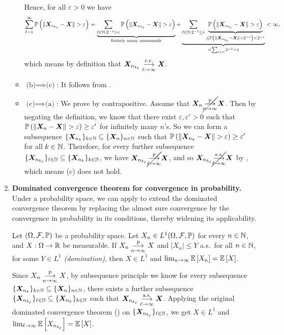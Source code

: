 \begin{enumerate}
\begin{pf}
\begin{itemize}
Hence, for all \(\varepsilon>0\) we have
\[
\sum_{\ell=1}^{\infty}\prob{\|\vect{X}_{n_{k_{\ell}}}-\vect{X}\|>\varepsilon}
=\underbrace{\sum_{\ell\in\N:2^{-\ell}>\varepsilon}^{}
\prob{\|\vect{X}_{n_{k_{\ell}}}-\vect{X}\|>\varepsilon}}_{\text{finitely many summands}}
+\underbrace{\sum_{\ell\in\N:2^{-\ell}\le\varepsilon}^{}
\underbrace{\prob{\|\vect{X}_{n_{k_{\ell}}}-\vect{X}\|>\varepsilon}}_{
\le\prob{\|\vect{X}_{n_{k_{\ell}}}-\vect{X}\|>2^{-\ell}}<2^{-\ell}}}
_{<\sum_{\ell\in\N}^{}2^{-\ell}=1}
<\infty,
\]
which means by definition that
\(\bm{X}_{n_{k_{\ell}}}\underset{\ell\to\infty}{\overset{\text{c.c.}}{\longrightarrow}}\bm{X}\).  \item
\(\text{(b)}\implies \text{(c)}\): It follows from .
\item \(\text{(c)}\implies \text{(a)}\): We prove by contrapositive. Assume
that \(\bm{X}_n\cancel{\underset{n\to\infty}{\overset{\text{p}}{\longrightarrow}}}\bm{X}\). Then by negating the definition, we
know that there exist \(\varepsilon,\varepsilon'>0\) such that
\(\prob{\|\vect{X}_{n}-\vect{X}\|>\varepsilon}\ge\varepsilon'\) for infinitely
many \(n\)'s. So we can form a subsequence
\(\{\bm{X}_{n_{k}}\}_{k\in\mathbb{N}}\subseteq \{\bm{X}_n\}_{n\in\mathbb{N}}\) such that
\(\prob{\|\vect{X}_{n_{k}}-\vect{X}\|>\varepsilon}\ge\varepsilon'\) for all
\(k\in\mathbb{N}\). Therefore, for every further subsequence
\(\{\bm{X}_{n_{k_{\ell}}}\}_{\ell\in\mathbb{N}}
\subseteq\{\bm{X}_{n_{k}}\}_{k\in\mathbb{N}}\), we have
\(\bm{X}_{n_{k_{\ell}}}\cancel{\underset{\ell\to\infty}{\overset{\text{p}}{\longrightarrow}}}\bm{X}\), and so
\(\bm{X}_{n_{k_{\ell}}}\cancel{\underset{\ell\to\infty}{\overset{\text{a.s.}}{\longrightarrow}}}\bm{X}\) by
, which means (c) does not hold.
\end{itemize}
\end{pf}
\item \textbf{Dominated convergence theorem for convergence in probability.}
Under a probability space, we can apply  to
extend the dominated convergence theorem by replacing the almost sure
convergence by the convergence in probability in its conditions, thereby
widening its applicability.
\begin{corollary}
\label{cor:dct-ip-version}
Let \((\Omega,\mathcal{F},\mathbb{P})\) be a probability space.  Let \(X_n\in
L^{1}(\Omega,\mathcal{F},\mathbb{P})\) for every \(n\in\mathbb{N}\), and \(X:\Omega\to\mathbb{R}\) be
measurable.  If \(X_n\underset{n\to\infty}{\overset{\text{p}}{\longrightarrow}} X\) and \(|X_n|\le Y\) a.s.\ for all \(n\in\mathbb{N}\), for
some \(Y\in L^{1}\) \emph{(domination)}, then \(X\in L^{1}\) and
\(\lim_{n\to\infty}\mathbb{E}\left[X_n\right]=\mathbb{E}\left[X\right]\).
\end{corollary}
\begin{pf}
Since \(X_n\underset{n\to\infty}{\overset{\text{p}}{\longrightarrow}} X\), by subsequence principle we know
for every subsequence \(\{\bm{X}_{n_{k}}\}_{k\in\mathbb{N}}\subseteq \{\bm{X}_n\}_{n\in\mathbb{N}}\),
there exists a further subsequence
\(\{\bm{X}_{n_{k_{\ell}}}\}_{\ell\in\mathbb{N}}\subseteq \{\bm{X}_{n_{k}}\}_{k\in\mathbb{N}}\)
such that \(\bm{X}_{n_{k_{\ell}}}\underset{\ell\to\infty}{\overset{\text{a.s.}}{\longrightarrow}}\bm{X}\).
Applying the original dominated convergence theorem ()
on \(\{\bm{X}_{n_{k_{\ell}}}\}_{\ell\in\mathbb{N}}\), we get \(X\in L^{1}\) and
\(\lim_{\ell\to\infty}\mathbb{E}\left[X_{n_{k_{\ell}}}\right]=\mathbb{E}\left[X\right]\).


\end{pf}
\end{enumerate}

